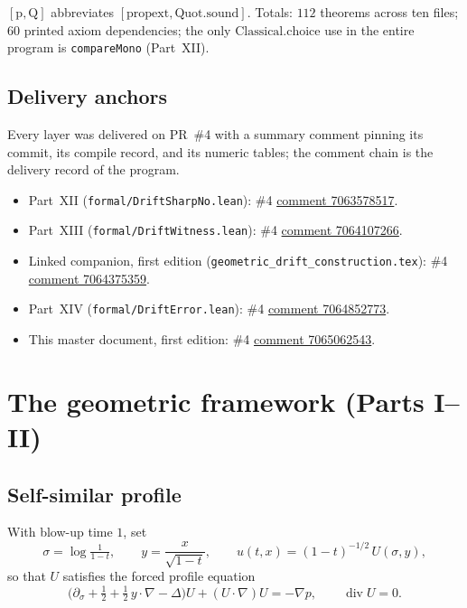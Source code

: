 \documentclass[11pt]{article}
\theoremstyle{plain}
\theoremstyle{definition}
\begin{document}
$[\mathrm{p},\mathrm{Q}]$ abbreviates $[\mathrm{propext},\mathrm{Quot.sound}]$.
Totals: $112$ theorems across ten files; $60$ printed axiom dependencies; the only
$\mathrm{Classical.choice}$ use in the entire program is \texttt{compareMono} (Part~XII).

\subsection*{Delivery anchors}

Every layer was delivered on PR~\#4 with a summary comment pinning its commit, its compile
record, and its numeric tables; the comment chain is the delivery record of the program.
\begin{itemize}
\item Part~XII (\texttt{formal/DriftSharpNo.lean}): \#4
\href{https://github.com/duboispaulihp-sys/pauldubois/pull/4#issuecomment-7063578517}{comment 7063578517}.
\item Part~XIII (\texttt{formal/DriftWitness.lean}): \#4
\href{https://github.com/duboispaulihp-sys/pauldubois/pull/4#issuecomment-7064107266}{comment 7064107266}.
\item Linked companion, first edition (\texttt{geometric\_drift\_construction.tex}): \#4
\href{https://github.com/duboispaulihp-sys/pauldubois/pull/4#issuecomment-7064375359}{comment 7064375359}.
\item Part~XIV (\texttt{formal/DriftError.lean}): \#4
\href{https://github.com/duboispaulihp-sys/pauldubois/pull/4#issuecomment-7064852773}{comment 7064852773}.
\item This master document, first edition: \#4
\href{https://github.com/duboispaulihp-sys/pauldubois/pull/4#issuecomment-7065062543}{comment 7065062543}.
\end{itemize}

\section{The geometric framework (Parts I--II)}\label{sec:framework}

\subsection{Self-similar profile}
With blow-up time $1$, set
\[
\sigma=\log\tfrac{1}{1-t},\qquad
y=\frac{x}{\sqrt{1-t}},\qquad
u(t,x)=(1-t)^{-1/2}\,U(\sigma,y),
\]
so that $U$ satisfies the forced profile equation
\[
\bigl(\partial_\sigma+\tfrac12+\tfrac12\,y\cdot\nabla-\Delta\bigr)U+(U\cdot\nabla)U
= -\nabla p,\qquad \operatorname{div}U=0 .
\]
\end{document}
